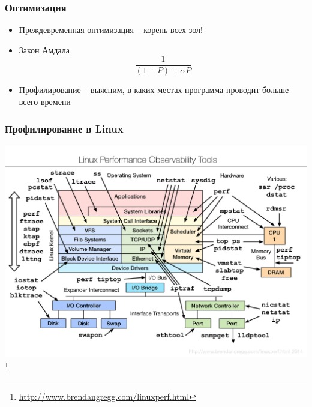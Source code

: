 \begin{frame}
 \frametitle{Оптимизация}
 \begin{itemize}
  \item Преждевременная оптимизация -- корень всех зол!
  \pause
  \item Закон Амдала
     \begin{equation*}
        \frac{1}{(1-P)+\alpha P}
     \end{equation*}
  \item Профилирование -- выясним, в каких местах программа проводит больше всего времени
 \end{itemize}
\end{frame}

\begin{frame}
    \frametitle{Профилирование в Linux}
    \center
    \includegraphics[height=0.75\textheight]{../../slides/profile/linux_observability_tools.png}\footnote{\url{http://www.brendangregg.com/linuxperf.html}}

\end{frame}


